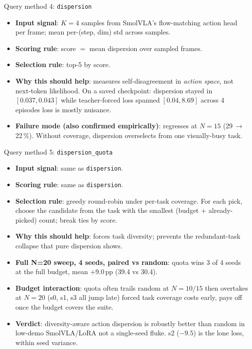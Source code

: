 \documentclass[aspectratio=169]{beamer}
\newcommand{\good}[1]{\textcolor{good}{#1}}
\begin{document}
\begin{frame}{Query method 4: \texttt{dispersion}}
\begin{itemize}
  \item \textbf{Input signal}: $K{=}4$ samples from SmolVLA's flow-matching action head per frame; mean per-(step, dim) std across samples.
  \item \textbf{Scoring rule}: score $=$ mean dispersion over sampled frames.
  \item \textbf{Selection rule}: top-5 by score.
  \item \textbf{Why this should help}: measures self-disagreement in \emph{action space}, not next-token likelihood. On a saved checkpoint: dispersion stayed in $[0.037, 0.043]$ while teacher-forced loss spanned $[0.04, 8.69]$ across 4 episodes \textemdash{} loss is mostly nuisance.
  \item \textbf{Failure mode (also confirmed empirically)}: regresses at $N{=}15$ (29\,$\to$\,22\,\%). Without coverage, dispersion overselects from one visually-busy task.
\end{itemize}
\end{frame}

\begin{frame}{Query method 5: \texttt{dispersion\_quota}}
\begin{itemize}
  \item \textbf{Input signal}: same as \texttt{dispersion}.
  \item \textbf{Scoring rule}: same as \texttt{dispersion}.
  \item \textbf{Selection rule}: greedy round-robin under per-task coverage. For each pick, choose the candidate from the task with the smallest (budget $+$ already-picked) count; break ties by score.
  \item \textbf{Why this should help}: forces task diversity; prevents the redundant-task collapse that pure dispersion shows.
  \item \textbf{Full N=20 sweep, 4 seeds, paired vs random}: quota wins \good{3 of 4} seeds at the full budget, \good{mean $+9.0$\,pp} (39.4 vs 30.4).
  \item \textbf{Budget interaction}: quota often trails random at $N{=}10/15$ then \good{overtakes at $N{=}20$} (s0, s1, s3 all jump late) \textemdash{} forced task coverage costs early, pays off once the budget covers the suite.
  \item \textbf{Verdict}: diversity-aware action dispersion is \good{robustly} better than random in low-demo SmolVLA/LoRA \textemdash{} not a single-seed fluke. s2 ($-9.5$) is the lone loss, within seed variance.
\end{itemize}
\end{frame}
\end{document}
